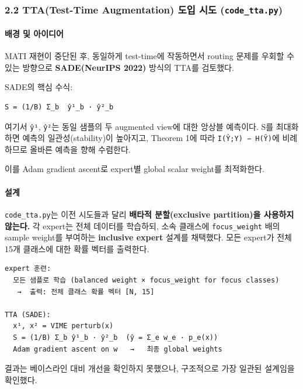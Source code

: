 \subsubsection{2.2 TTA(Test-Time Augmentation) 도입 시도 (\texttt{code\_\allowbreak{}\allowbreak{}tta\allowbreak{}.\allowbreak{}py})}
\paragraph{배경 및 아이디어}
MATI 재현이 중단된 후, 동일하게 test-time에 작동하면서 routing 문제를 우회할 수 있는 방향으로 \textbf{SADE(NeurIPS 2022)} 방식의 TTA를 검토했다.

SADE의 핵심 수식:


\begin{Verbatim}[breaklines=true,breakanywhere=true,fontsize=\scriptsize]
S = (1/B) Σ_b  ŷ¹_b · ŷ²_b

\end{Verbatim}
여기서 \texttt{ŷ¹}, \texttt{ŷ²}는 동일 샘플의 두 augmented view에 대한 앙상블 예측이다. S를 최대화하면 예측의 일관성(stability)이 높아지고, Theorem 1에 따라 \texttt{I(Ŷ;Y) −\allowbreak{} H(Ŷ)}에 비례하므로 올바른 예측을 향해 수렴한다.

이를 Adam gradient ascent로 expert별 global scalar weight를 최적화한다.

\paragraph{설계}
\texttt{code\_\allowbreak{}\allowbreak{}tta\allowbreak{}.\allowbreak{}py}는 이전 시도들과 달리 \textbf{배타적 분할(exclusive partition)을 사용하지 않는다.} 각 expert는 전체 데이터를 학습하되, 소속 클래스에 \texttt{focus\_\allowbreak{}\allowbreak{}we\allowbreak{}ight} 배의 sample weight를 부여하는 \textbf{inclusive expert} 설계를 채택했다. 모든 expert가 전체 15개 클래스에 대한 확률 벡터를 출력한다.


\begin{Verbatim}[breaklines=true,breakanywhere=true,fontsize=\scriptsize]
expert 훈련:
  모든 샘플로 학습 (balanced weight × focus_weight for focus classes)
   →  출력: 전체 클래스 확률 벡터 [N, 15]

TTA (SADE):
  x¹, x² = VIME perturb(x)
  S = (1/B) Σ_b ŷ¹_b · ŷ²_b  (ŷ = Σ_e w_e · p_e(x))
  Adam gradient ascent on w   →   최종 global weights

\end{Verbatim}
결과는 베이스라인 대비 개선을 확인하지 못했으나, 구조적으로 가장 일관된 설계임을 확인했다.



